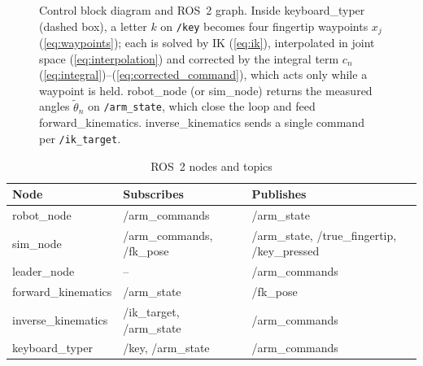 \documentclass[letterpaper, 10 pt, conference]{ieeeconf}
\begin{document}
\begin{figure}[t]
  \caption{Control block diagram and ROS~2 graph. Inside keyboard\_typer (dashed box), a letter $k$ on
  \texttt{/key} becomes four fingertip waypoints $x_j$ (\ref{eq:waypoints}); each is solved by IK
  (\ref{eq:ik}), interpolated in joint space (\ref{eq:interpolation}) and corrected by the integral term
  $c_n$ (\ref{eq:integral})--(\ref{eq:corrected_command}), which acts only while a waypoint is held.
  robot\_node (or sim\_node) returns the measured angles $\tilde{\theta}_n$ on \texttt{/arm\_state}, which
  close the loop and feed forward\_kinematics. inverse\_kinematics sends a single command per
  \texttt{/ik\_target}.}
  \label{fig:block}
\end{figure}

\begin{table}[t]
\caption{ROS~2 nodes and topics}
\label{tab:nodes}
\begin{center}
\footnotesize
\setlength{\tabcolsep}{3pt}
\begin{tabular}{>{\raggedright\arraybackslash}p{2.3cm}>{\raggedright\arraybackslash}p{2.4cm}>{\raggedright\arraybackslash}p{2.7cm}}
\toprule
Node & Subscribes & Publishes \\
\midrule
robot\_node & /arm\_commands & /arm\_state \\
sim\_node & /arm\_commands, /fk\_pose & /arm\_state, /true\_fingertip, /key\_pressed \\
leader\_node & -- & /arm\_commands \\
forward\_kinematics & /arm\_state & /fk\_pose \\
inverse\_kinematics & /ik\_target, /arm\_state & /arm\_commands \\
keyboard\_typer & /key, /arm\_state & /arm\_commands \\
\bottomrule
\end{tabular}
\end{center}
\end{table}
\end{document}
